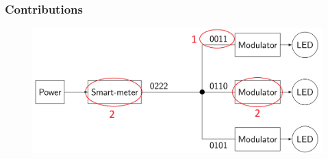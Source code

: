 \documentclass{beamer}
\begin{document}
	\begin{frame}\frametitle{Contributions}



		\begin{figure}
			\centering
			\includegraphics[width=\textwidth]{contributions-figure.png}
		\end{figure}

		\begin{enumerate}


\end{enumerate}
\end{frame}
\end{document}

